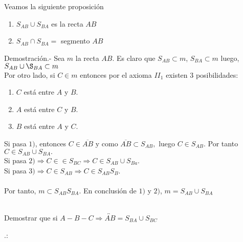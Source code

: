 \begin{proposicion} Veamos la siguiente proposición
\begin{enumerate}[\bfseries a)]
\item $S_{AB} \cup S_{BA}$ es la recta $AB$
\item $S_{AB} \cap S_{BA} =$ segmento $AB$\\
\end{enumerate}
Demostración.- \; Sea $m$ la recta $AB$. Es claro que $S_{AB} \subset m$, $S_{BA} \subset m$ luego, $S_{AB} \cup \S_{BA} \subset m$\\
Por otro lado, si $C \in m$ entonces por el axioma $II_1$ existen 3 posibilidades:
\begin{enumerate}[\bfseries 1)]
\item $C$ está entre $A$ y $B$.
\item $A$ está entre $C$ y $B$.
\item $B$ está entre $A$ y $C$.
\end{enumerate}
Si pasa $1)$, entonces $C \in \overline{AB}$ y como $\overline{AB} \subset S_{AB},$ luego $C \in S_{AB}.$ Por tanto $C \in S_{AB} \cup S_{BA}.$\\
Si pasa $2) \Rightarrow C \in \in S_{BC} \Rightarrow C \in S_{AB} \cup S_{Ba}.$ \\
Si pasa $3) \Rightarrow C \in S_{AB} \Rightarrow C \in S_{A B} S_{B}.$\\\\
Por tanto, $m \subset S_{AB} S_{BA}$. En conclusión de $1)$ y $2)$, $m = S_{AB} \cup S_{BA}$\\\\ 

\end{proposicion}

\begin{ej}
Demostrar que si $A-B-C \Rightarrow \overleftrightarrow{AB} = S_{BA} \cup S_{BC}$ 
\end{ej}.:
